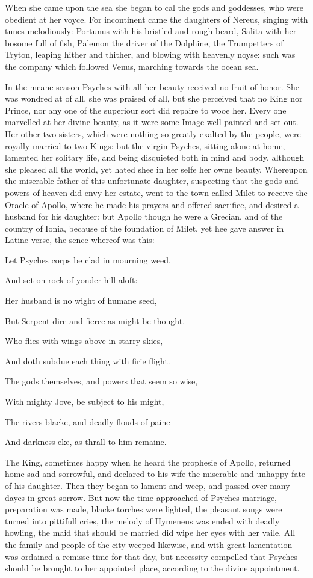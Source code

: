 When she came upon the sea she began to cal the gods and goddesses, who were
obedient at her voyce. For incontinent came the daughters of Nereus, singing
with tunes melodiously: Portunus with his bristled and rough beard, Salita with
her bosome full of fish, Palemon the driver of the Dolphine, the Trumpetters of
Tryton, leaping hither and thither, and blowing with heavenly noyse: such was
the company which followed Venus, marching towards the ocean sea.

In the meane season Psyches with all her beauty received no fruit of honor. She
was wondred at of all, she was praised of all, but she perceived that no King
nor Prince, nor any one of the superiour sort did repaire to wooe her. Every
one marvelled at her divine beauty, as it were some Image well painted and set
out. Her other two sisters, which were nothing so greatly exalted by the
people, were royally married to two Kings: but the virgin Psyches, sitting
alone at home, lamented her solitary life, and being disquieted both in mind
and body, although she pleased all the world, yet hated shee in her selfe her
owne beauty. Whereupon the miserable father of this unfortunate daughter,
suspecting that the gods and powers of heaven did envy her estate, went to the
town called Milet to receive the Oracle of Apollo, where he made his prayers
and offered sacrifice, and desired a husband for his daughter: but Apollo
though he were a Grecian, and of the country of Ionia, because of the
foundation of Milet, yet hee gave answer in Latine verse, the sence whereof was
this:—

Let Psyches corps be clad in mourning weed,

And set on rock of yonder hill aloft:

Her husband is no wight of humane seed,

But Serpent dire and fierce as might be thought.

Who flies with wings above in starry skies,

And doth subdue each thing with firie flight.

The gods themselves, and powers that seem so wise,

With mighty Jove, be subject to his might,

The rivers blacke, and deadly flouds of paine

And darkness eke, as thrall to him remaine.

The King, sometimes happy when he heard the prophesie of Apollo, returned home
sad and sorrowful, and declared to his wife the miserable and unhappy fate of
his daughter. Then they began to lament and weep, and passed over many dayes in
great sorrow. But now the time approached of Psyches marriage, preparation was
made, blacke torches were lighted, the pleasant songs were turned into
pittifull cries, the melody of Hymeneus was ended with deadly howling, the maid
that should be married did wipe her eyes with her vaile. All the family and
people of the city weeped likewise, and with great lamentation was ordained a
remisse time for that day, but necessity compelled that Psyches should be
brought to her appointed place, according to the divine appointment.

